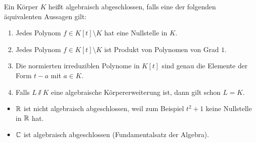 \documentclass[12pt,a4paper]{scrartcl}
\begin{document}
\begin{satz}\label{thm:algab}
	Ein Körper $K$ heißt algebraisch abgeschlossen, falls eine der folgenden äquivalenten Aussagen gilt:
	\begin{enumerate}
		\item Jedes Polynom $f\in K[t]\setminus K$ hat eine Nullstelle in $K$. \label{enumi:algab:1}
		\item Jedes Polynom $f\in K[t]\setminus K$ ist Produkt von Polynomen von Grad $1$. \label{enumi:algab:2}
		\item Die normierten irreduziblen Polynome in $K[t]$ sind genau die Elemente der Form $t-a$ mit $a\in K$. \label{enumi:algab:3}
		\item Falls $L\sslash K$ eine algebraische Körpererweiterung ist, dann gilt schon $L = K$. \label{enumi:algab:4}
	\end{enumerate}
\end{satz}	

\begin{bsp}
	\leavevmode
	\begin{itemize}
		\item $\mathbb R$ ist nicht algebraisch abgeschlossen, weil zum Beispiel $t^2+1$ keine Nullstelle in $\mathbb R$ hat.
		\item $\mathbb C$ ist algebraisch abgeschlossen (Fundamentalsatz der Algebra).
	\end{itemize}
\end{bsp}
\end{document}
